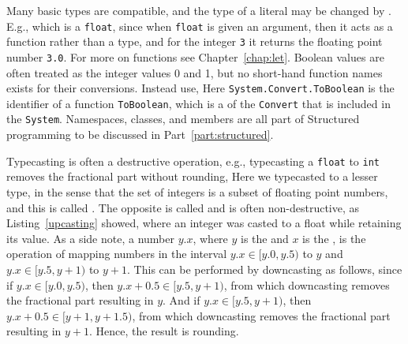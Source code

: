 Many basic types are compatible, and the type of a literal may be changed by . E.g.,
%
% 
which is a \lstinline!float!, since when \lstinline|float| is given an argument, then it acts as a function rather than a type, and for the integer \lstinline|3| it returns the floating point number \lstinline|3.0|.  For more on functions see Chapter~\ref{chap:let}. Boolean values are often treated as the integer values 0 and 1, but no short-hand function names exists for their conversions. Instead use,
%
% 
Here \lstinline|System.Convert.ToBoolean| is the identifier of a function \lstinline|ToBoolean|, which is a  of the  \lstinline|Convert| that is included in the  \lstinline|System|. Namespaces, classes, and members are all part of Structured programming to be discussed in Part~\ref{part:structured}.

Typecasting is often a destructive operation, e.g., typecasting a \lstinline{float} to \lstinline{int} removes the fractional part without rounding,
%
%
Here we typecasted to a lesser type, in the sense that the set of integers is a subset of floating point numbers, and this is called . The opposite is called  and is often non-destructive, as Listing~\ref{upcasting} showed, where an integer was casted to a float while retaining its value. As a side note,  a number $y.x$, where $y$ is the  and $x$ is the , is the operation of mapping numbers in the interval $y.x \in [y.0,y.5)$ to $y$ and $y.x\in [y.5,y+1)$ to $y+1$. This can be performed by downcasting as follows,
%
%
since if $y.x\in [y.0, y.5)$, then $y.x+0.5\in [y.5, y+1)$, from which downcasting removes the fractional part resulting in $y$. And if $y.x\in [y.5, y+1)$, then $y.x+0.5\in [y+1,y+1.5)$, from which downcasting removes the fractional part resulting in $y+1$. Hence, the result is rounding. 

